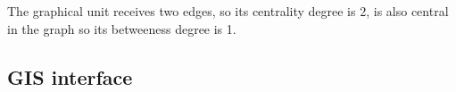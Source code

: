 \documentclass[article]{jss}
\newcommand{\fct}[1]{\code{#1()}}
\begin{document}

The  graphical unit receives two edges, so its centrality degree is 2,  is also central in the graph so its betweeness degree is 1.



\subsection{GIS interface} \label{sec:gis}






\end{document}
